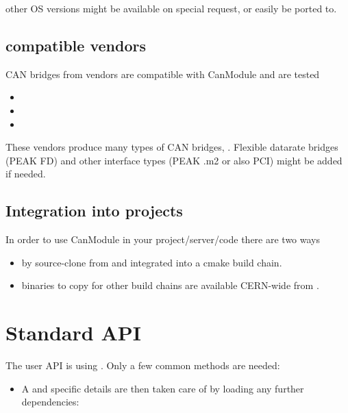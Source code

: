 \documentclass[letterpaper,10pt,english]{sphinxmanual}
\begin{document}
other OS versions might be available on special request, or easily be ported to.


\section{compatible vendors}
\label{\detokenize{objective:compatible-vendors}}
CAN bridges from vendors are compatible with CanModule and are tested
\begin{itemize}
\item {} 

\item {} 

\item {} 

\end{itemize}

These vendors produce many types of CAN bridges, . Flexible datarate bridges (PEAK FD) and other interface types
(PEAK .m2 or also PCI) might be added if needed.


\section{Integration into projects}
\label{\detokenize{objective:integration-into-projects}}
In order to use CanModule in your  project/server/code there are two ways
\begin{itemize}
\item {} 
by source-clone from  and integrated into a cmake build chain.

\item {} 
binaries to copy for other build chains are available CERN-wide from  .

\end{itemize}


\chapter{Standard API}
\label{\detokenize{standardApi:standard-api}}\label{\detokenize{standardApi::doc}}
The user API is using .
Only a few common methods are needed:
\begin{itemize}
\item {} 
A  and specific details are then taken care of by loading any further dependencies:

\end{itemize}
\end{document}
